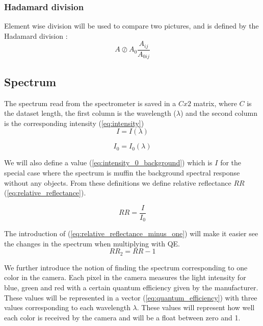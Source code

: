 \subsubsection{Hadamard division}
Element wise division will be used to compare two pictures, and is defined by the Hadamard division \cite{HadamardDivisionInfixed}:
\begin{equation}
    \label{eq:element_wise_division_image}
    A \oslash  A_0  \frac{A_{ij}}{A_{0ij} } %
\end{equation}


\subsection{Spectrum}
\label{sec:spectrum}

The spectrum read from the spectrometer is saved in a $C x 2$ matrix, where $C$ is the dataset length, the first column is the wavelength ($\lambda$) and the second column is the corresponding intensity (\ref{eq:intensity})
\begin{equation}
    \label{eq:intensity}
    I = I(\lambda)    
\end{equation}

\begin{equation}
    \label{eq:intensity_0_background}
    I_0 = I_0(\lambda)
\end{equation}

We will also define a value (\ref{eq:intensity_0_background}) which is $I$ for the special case where the spectrum is muffin the background spectral response without any objects. From these definitions we define relative reflectance $RR$ (\ref{eq:relative_reflectance}). 

\begin{equation}
    \label{eq:relative_reflectance}
    RR = \frac{I}{I_0}
\end{equation}


The introduction of (\ref{eq:relative_reflectance_minus_one}) will make it easier see the changes in the spectrum when multiplying with QE.  
\begin{equation}
    \label{eq:relative_reflectance_minus_one}
    RR_2 = RR - 1
\end{equation}

We further introduce the notion of finding the spectrum corresponding to one color in the camera. Each pixel in the camera measures the light intensity for blue, green and red with a certain quantum efficiency given by the manufacturer. These values will be represented in a vector (\ref{eq:quantum_efficiency}) with three values corresponding to each wavelength $\lambda$. These values will represent how well each color is received by the camera and will be a float between zero and 1. 

